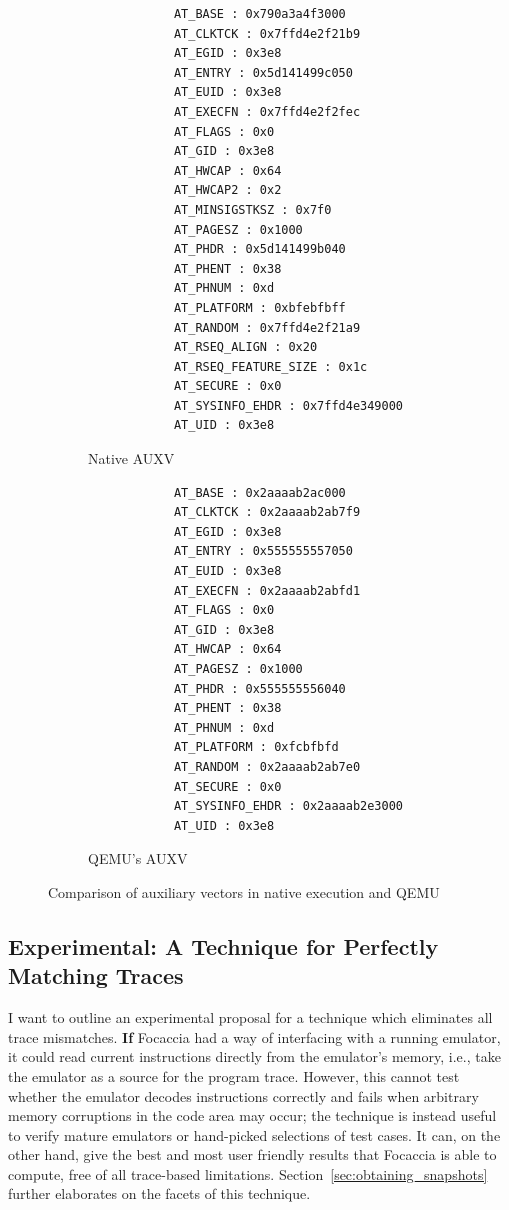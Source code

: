 \begin{figure}[htpb]
    \begin{subfigure}[t]{0.4\linewidth}
        \begin{lstlisting}
            AT_BASE : 0x790a3a4f3000
            AT_CLKTCK : 0x7ffd4e2f21b9
            AT_EGID : 0x3e8
            AT_ENTRY : 0x5d141499c050
            AT_EUID : 0x3e8
            AT_EXECFN : 0x7ffd4e2f2fec
            AT_FLAGS : 0x0
            AT_GID : 0x3e8
            AT_HWCAP : 0x64
            AT_HWCAP2 : 0x2
            AT_MINSIGSTKSZ : 0x7f0
            AT_PAGESZ : 0x1000
            AT_PHDR : 0x5d141499b040
            AT_PHENT : 0x38
            AT_PHNUM : 0xd
            AT_PLATFORM : 0xbfebfbff
            AT_RANDOM : 0x7ffd4e2f21a9
            AT_RSEQ_ALIGN : 0x20
            AT_RSEQ_FEATURE_SIZE : 0x1c
            AT_SECURE : 0x0
            AT_SYSINFO_EHDR : 0x7ffd4e349000
            AT_UID : 0x3e8
        \end{lstlisting}
    \caption{Native AUXV}
    \label{fig:native_auxv}
    \end{subfigure}
    \hfill
    \begin{subfigure}[t]{0.4\linewidth}
        \begin{lstlisting}
            AT_BASE : 0x2aaaab2ac000
            AT_CLKTCK : 0x2aaaab2ab7f9
            AT_EGID : 0x3e8
            AT_ENTRY : 0x555555557050
            AT_EUID : 0x3e8
            AT_EXECFN : 0x2aaaab2abfd1
            AT_FLAGS : 0x0
            AT_GID : 0x3e8
            AT_HWCAP : 0x64
            AT_PAGESZ : 0x1000
            AT_PHDR : 0x555555556040
            AT_PHENT : 0x38
            AT_PHNUM : 0xd
            AT_PLATFORM : 0xfcbfbfd
            AT_RANDOM : 0x2aaaab2ab7e0
            AT_SECURE : 0x0
            AT_SYSINFO_EHDR : 0x2aaaab2e3000
            AT_UID : 0x3e8
        \end{lstlisting}
        \caption{QEMU's AUXV}
        \label{fig:qemu_auxv}
    \end{subfigure}
    \caption{Comparison of auxiliary vectors in native execution and QEMU}
    \label{fig:auxv_comparison}
\end{figure}

\subsection{Experimental: A Technique for Perfectly Matching Traces}\label{sec:experimental_trace_match}

I want to outline an experimental proposal for a technique which eliminates all trace mismatches. \textbf{If} Focaccia
had a way of interfacing with a running emulator, it could read current instructions directly from the emulator's
memory, i.e., take the emulator as a source for the program trace. However, this cannot test whether the emulator
decodes instructions correctly and fails when arbitrary memory corruptions in the code area may occur; the technique is
instead useful to verify mature emulators or hand-picked selections of test cases. It can, on the other hand, give the
best and most user friendly results that Focaccia is able to compute, free of all trace-based limitations.
Section~\ref{sec:obtaining_snapshots} further elaborates on the facets of this technique.

